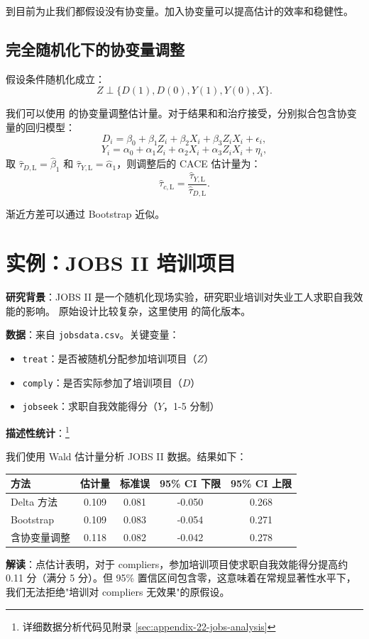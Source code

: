 到目前为止我们都假设没有协变量。加入协变量可以提高估计的效率和稳健性。

\subsection{完全随机化下的协变量调整}

假设条件随机化成立：
\[
Z \perp \{D(1), D(0), Y(1), Y(0), X\}.
\]

我们可以使用 \citet{Lin:2013} 的协变量调整估计量。对于结果和和治疗接受，分别拟合包含协变量的回归模型：
\[
D_i = \beta_0 + \beta_1 Z_i + \beta_2 X_i + \beta_3 Z_i X_i + \epsilon_i,
\]
\[
Y_i = \alpha_0 + \alpha_1 Z_i + \alpha_2 X_i + \alpha_3 Z_i X_i + \eta_i,
\]
取 $\hat{\tau}_{D,\text{L}} = \hat{\beta}_1$ 和 $\hat{\tau}_{Y,\text{L}} = \hat{\alpha}_1$，则调整后的 CACE 估计量为：
\[
\hat{\tau}_{c,\text{L}} = \frac{\hat{\tau}_{Y,\text{L}}}{\hat{\tau}_{D,\text{L}}}.
\label{eq:22-lin-cace}
\]

渐近方差可以通过 Bootstrap 近似。

\section{实例：JOBS II 培训项目}\label{sec:22-application}

\textbf{研究背景}：JOBS II 是一个随机化现场实验，研究职业培训对失业工人求职自我效能的影响。\citet{JuddKenny:1981} 原始设计比较复杂，这里使用 \citet{ImbensKlein:2015} 的简化版本。

\textbf{数据}：来自 \texttt{jobsdata.csv}。关键变量：
\begin{itemize}
  \item \texttt{treat}：是否被随机分配参加培训项目（$Z$）
  \item \texttt{comply}：是否实际参加了培训项目（$D$）
  \item \texttt{jobseek}：求职自我效能得分（$Y$，1-5 分制）
\end{itemize}

\textbf{描述性统计}：\footnote{详细数据分析代码见附录 \cref{sec:appendix-22-jobs-analysis}}

\begin{Example}\label{ex:22-jobs-iv}
我们使用 Wald 估计量分析 JOBS II 数据。结果如下：

\begin{center}
\begin{tabular}{lcccc}
\hline
方法 & 估计量 & 标准误 & 95\% CI 下限 & 95\% CI 上限 \\
\hline
Delta 方法 & 0.109 & 0.081 & -0.050 & 0.268 \\
Bootstrap & 0.109 & 0.083 & -0.054 & 0.271 \\
含协变量调整 & 0.118 & 0.082 & -0.042 & 0.278 \\
\hline
\end{tabular}
\end{center}

\textbf{解读}：点估计表明，对于 compliers，参加培训项目使求职自我效能得分提高约 0.11 分（满分 5 分）。但 95\% 置信区间包含零，这意味着在常规显著性水平下，我们无法拒绝"培训对 compliers 无效果"的原假设。
\end{Example}

